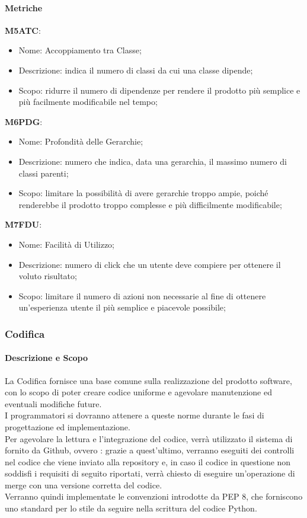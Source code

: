     \paragraph{Metriche} \hfill \break
    \textbf{M5ATC}:
    \begin{itemize}
      \item Nome: Accoppiamento tra Classe;
      \item Descrizione: indica il numero di classi da cui una classe dipende;
      \item Scopo: ridurre il numero di dipendenze per rendere il prodotto più semplice e più facilmente modificabile nel tempo;
    \end{itemize}
    \textbf{M6PDG}:
    \begin{itemize}
      \item Nome: Profondità delle Gerarchie;
      \item Descrizione: numero che indica, data una gerarchia, il massimo numero di classi parenti;
      \item Scopo: limitare la possibilità di avere gerarchie troppo ampie, poiché renderebbe il prodotto troppo complesse e più difficilmente modificabile;
    \end{itemize}
    \textbf{M7FDU}:
    \begin{itemize}
      \item Nome: Facilità di Utilizzo;
      \item Descrizione: numero di click che un utente deve compiere per ottenere il voluto risultato;
      \item Scopo: limitare il numero di azioni non necessarie al fine di ottenere un'esperienza utente il più semplice e piacevole possibile;
    \end{itemize}

	\subsubsection{Codifica} 
		\paragraph{Descrizione e Scopo} \hfill \break
		La Codifica fornisce una base comune sulla realizzazione del prodotto software, con lo scopo di poter creare codice uniforme e agevolare manutenzione ed eventuali modifiche future. \\
		I programmatori si dovranno attenere a queste norme durante le fasi di progettazione ed implementazione. \\
    Per agevolare la lettura e l'integrazione del codice, verrà utilizzato il sistema di  fornito da Github, ovvero : grazie a quest'ultimo, verranno
    eseguiti dei controlli nel codice che viene inviato alla repository e, in caso il codice in questione non soddisfi i requisiti di seguito riportati, verrà chiesto di eseguire un'operazione di merge con una versione corretta del codice. \\
		Verranno quindi implementate le convenzioni introdotte da PEP 8, che forniscono uno standard per lo stile da seguire nella scrittura del codice Python.

